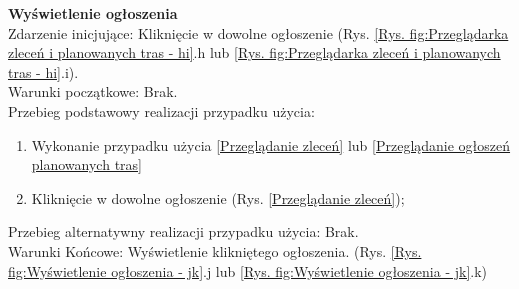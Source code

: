 \textbf{Wyświetlenie ogłoszenia} \\
Zdarzenie inicjujące: Kliknięcie w dowolne ogłoszenie (Rys. \ref{Rys. fig:Przeglądarka zleceń i planowanych tras - hi}.h lub \ref{Rys. fig:Przeglądarka zleceń i planowanych tras - hi}.i). \\
Warunki początkowe: Brak. \\
Przebieg podstawowy realizacji przypadku użycia:
\begin{enumerate}
    \item Wykonanie przypadku użycia \ref{Przeglądanie zleceń} lub \ref{Przeglądanie ogłoszeń planowanych tras}
    \item Kliknięcie w dowolne ogłoszenie (Rys. \ref{Przeglądanie zleceń});
\end{enumerate}
Przebieg alternatywny realizacji przypadku użycia: Brak. \\
Warunki Końcowe: Wyświetlenie klikniętego ogłoszenia. (Rys. \ref{Rys. fig:Wyświetlenie ogłoszenia - jk}.j lub \ref{Rys. fig:Wyświetlenie ogłoszenia - jk}.k)
